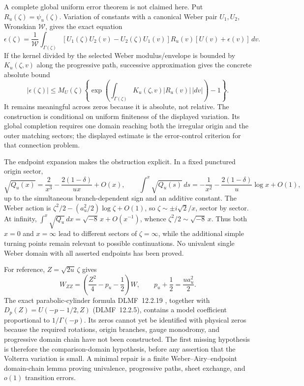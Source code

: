 \documentclass[11pt]{article}
\theoremstyle{remark}
\begin{document}
A complete global uniform error theorem is not claimed here.  Put
\(R_u(\zeta)=\psi_u(\zeta)\).  Variation of constants with a canonical Weber pair
\(U_1,U_2\), Wronskian \(\mathcal W\), gives the exact equation
\begin{equation}
 \epsilon(\zeta)=\frac1{\mathcal W}
 \int_{\Gamma(\zeta)}[U_1(\zeta)U_2(v)-U_2(\zeta)U_1(v)]
 R_u(v)[U(v)+\epsilon(v)]\,dv.
 \label{eq:weber-error-integral}
\end{equation}
If the kernel divided by the selected Weber modulus/envelope is bounded by
\(K_u(\zeta,v)\) along the progressive path, successive approximation gives
the concrete absolute bound
\begin{equation}
 |\epsilon(\zeta)|\leq M_U(\zeta)
 \left\{\exp\!\left(\int_{\Gamma(\zeta)}
 K_u(\zeta,v)|R_u(v)|\,|dv|\right)-1\right\}.
 \label{eq:weber-conditional-bound}
\end{equation}
It remains meaningful across zeros because it is absolute, not relative.
The construction is conditional on uniform finiteness of the displayed
variation.  Its global completion requires one domain reaching both the
irregular origin and the outer matching sectors; the displayed estimate is
the error-control criterion for that connection problem.

The endpoint expansion makes the obstruction explicit.  In a fixed
punctured origin sector,
\begin{equation}
 \sqrt{Q_u(x)}=\frac2{x^3}-\frac{2(1-\delta)}{ux}+O(x),\qquad
 \int^x\sqrt{Q_u(s)}\,ds=-\frac1{x^2}
 -\frac{2(1-\delta)}u\log x+O(1),
 \label{eq:strong-drive-origin-action}
\end{equation}
up to the simultaneous branch-dependent sign and an additive constant.
The Weber action is
\(\zeta^2/2-(a_u^2/2)\log\zeta+O(1)\), so
\(\zeta\sim\pm i\sqrt2/x\), sector by sector.  At infinity,
\(\int^x\sqrt{Q_u}\,dx=\sqrt{-8}\,x+O(x^{-1})\), whence
\(\zeta^2/2\sim\sqrt{-8}\,x\).  Thus both \(x=0\) and \(x=\infty\) lead to
different sectors of \(\zeta=\infty\), while the additional simple turning
points remain relevant to possible continuations.  No univalent single
Weber domain with all asserted endpoints has been proved.

For reference, \(Z=\sqrt{2u}\,\zeta\) gives
\begin{equation}
 W_{ZZ}=\left(\frac{Z^2}{4}-p_u-\frac12\right)W,\qquad
 p_u+\frac12=\frac{u a_u^2}{2}.
 \label{eq:strong-drive-weber-index}
\end{equation}
The exact parabolic-cylinder formula DLMF~12.2.19 \cite{DLMF12}, together with
\(D_p(Z)=U(-p-1/2,Z)\) (DLMF~12.2.5), contains a model coefficient
proportional to \(1/\Gamma(-p)\).  Its zeros cannot yet be identified with
physical zeros because the required rotations, origin branches, gauge
monodromy, and progressive domain chain have not been constructed.  The
first missing hypothesis is therefore the comparison-domain hypothesis,
before any assertion that the Volterra variation is small.  A minimal repair
is a finite Weber--Airy--endpoint domain-chain lemma proving univalence,
progressive paths, sheet exchange, and \(o(1)\) transition errors.
\end{document}
